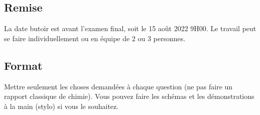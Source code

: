 \documentclass[12pt,letterpaper]{article}
\begin{document}
\subsection*{Remise}
La date butoir est avant l'examen final, soit le 15 août 2022 9H00. Le travail peut se faire individuellement ou en équipe de 2 ou 3 personnes.
\subsection*{Format}
Mettre seulement les choses demandées à chaque question (ne pas faire un rapport classique de chimie). Vous pouvez faire les schémas et les démonstrations à la main (stylo) si vous le souhaitez.

\nocite{*}
\printbibliography[]
\end{document}
